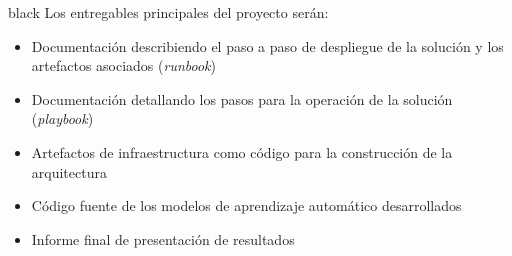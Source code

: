 \documentclass[11pt]{charter}
\begin{document}
\begin{consigna}{black}
Los entregables principales del proyecto serán: 
\begin{itemize}
\item Documentación describiendo el paso a paso de despliegue de la solución y los artefactos asociados (\textit{runbook})
\item Documentación detallando los pasos para la operación de la solución (\textit{playbook})
\item Artefactos de infraestructura como código para la construcción de la arquitectura
\item Código fuente de los modelos de aprendizaje automático desarrollados
\item Informe final de presentación de resultados

\end{itemize}

\end{consigna}
\end{document}
